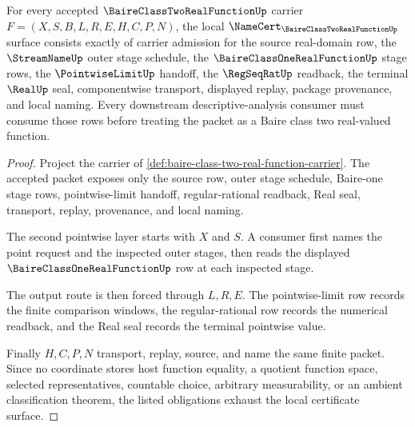 \begin{theorem}
\label{thm:baire-class-two-real-function-namecert-obligations}
For every accepted $\BaireClassTwoRealFunctionUp$ carrier $F=(X,S,B,L,R,E,H,C,P,N)$, the local $\NameCert_{\BaireClassTwoRealFunctionUp}$ surface consists exactly of carrier admission for the source real-domain row, the $\StreamNameUp$ outer stage schedule, the $\BaireClassOneRealFunctionUp$ stage rows, the $\PointwiseLimitUp$ handoff, the $\RegSeqRatUp$ readback, the terminal $\RealUp$ seal, componentwise transport, displayed replay, package provenance, and local naming. Every downstream descriptive-analysis consumer must consume those rows before treating the packet as a Baire class two real-valued function.
\end{theorem}
\begin{proof}
Project the carrier of \autoref{def:baire-class-two-real-function-carrier}. The accepted packet exposes only the source row, outer stage schedule, Baire-one stage rows, pointwise-limit handoff, regular-rational readback, Real seal, transport, replay, provenance, and local naming.

The second pointwise layer starts with $X$ and $S$. A consumer first names the point request and the inspected outer stages, then reads the displayed $\BaireClassOneRealFunctionUp$ row at each inspected stage.

The output route is then forced through $L,R,E$. The pointwise-limit row records the finite comparison windows, the regular-rational row records the numerical readback, and the Real seal records the terminal pointwise value.

Finally $H,C,P,N$ transport, replay, source, and name the same finite packet. Since no coordinate stores host function equality, a quotient function space, selected representatives, countable choice, arbitrary measurability, or an ambient classification theorem, the listed obligations exhaust the local certificate surface.
\end{proof}

